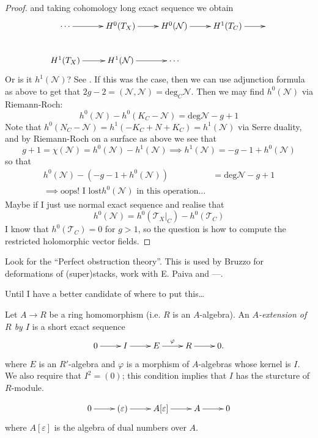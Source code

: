 \begin{proof}
and taking cohomology long exact sequence we
obtain
$$
\xymatrix{
\cdots\ar[r]&H^{0}(T_X)\ar[r]&H^{0}
(\mathcal{N})\ar[r]&H^{1}(T_C)\ar[r]&\\
H^{1}(T_X)\ar[r]&H^{1}(\mathcal{N})\ar[r]&
\cdots
}
$$
\medskip\noindent
Or is it $h^1(\mathcal{N})$? See
\cite{HarrMorr}. If this was the case, then
we
can use adjunction formula as above to get
that
$2g-2=(\mathcal{N},\mathcal{N})=\text{deg}_C
\mathcal{N}$. Then we may find
$h^0(\mathcal{N})$ via Riemann-Roch:
$$
h^0(\mathcal{N})-h^0(K_C-\mathcal{N})=
\text{deg}\mathcal{N}-g+1
$$
Note that
$h^0(N_C-\mathcal{N})=h^1(-K_C+N+K_C)=
h^1(\mathcal{N})$
via Serre
duality, and by Riemann-Roch on a surface as
above we see that
$$
g+1=\chi(\mathcal{N})=h^0(\mathcal{N})-
h^1(\mathcal{N})
\implies
h^1(\mathcal{N})=-g-1+h^0(\mathcal{N})
$$
so that
$$
\begin{aligned}
h^0(\mathcal{N})-(-g-1+h^0(\mathcal{N}))&=
\text{deg}\mathcal{N}-g+1\\
\implies \text{oops! I lost
$h^0(\mathcal{N})$ in this operation…}
\end{aligned}
$$
Maybe if I just use normal exact sequence and
realise that
$$
h^0(\mathcal{N})=h^0(\mathcal{T}_X|_{C})-
h^0(\mathcal{T}_C)
$$
I know that $h^0(\mathcal{T}_C)=0$ for $g>1$,
so the question is how to compute
the restricted holomorphic vector fields.
\end{proof}

\medskip\noindent
Look for the ``Perfect obstruction theory''.
This is used by Bruzzo for deformations of
(super)stacks,
work with E. Paiva and ---.

\medskip\noindent
Until I have a better candidate of where to
put this…

\begin{definition}
\label{definition-extension}
\begin{reference}
\cite[p.7]{Sernesi-deformations}
\end{reference}
Let $A \to R$ be a ring homomorphism
(i.e. $R$ is an $A$-algebra).
An {\it $A$-extension of $R$ by $I$} is a
short exact sequence
$$
\xymatrix{
0\ar[r]
&I\ar[r]
&E\ar[r]^\varphi
&R\ar[r]
&0.
}
$$
where $E$ is an $R'$-algebra
and $\varphi$ is a morphism of $A$-algebras
whose kernel is $I$.
We also require that $I^2=(0)$;
this condition implies that $I$ has the
sturcture of $R$-module.
\end{definition}

\begin{example}
\label{example-dual-numbers-extension}
$$
\xymatrix{
0\ar[r]
&(\varepsilon)\ar[r]
&A[\varepsilon]\ar[r]
&A\ar[r]
&0
}
$$
where $A[\varepsilon]$ is the algebra of dual
numbers over $A$.
\end{example}

